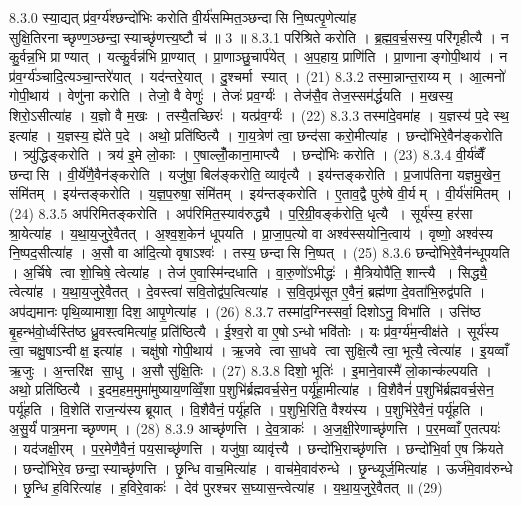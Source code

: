 8.3.0
स्या॒द्यत् प्र॑व॒र्ग्य॑श्छन्दो॑भिः करोति वी॒र्य॑सम्मित॒ञ्छन्दासि नि॒ष्पत्पृ॒णेत्या॑ह सुक्षि॒तिरनाच्छृण्ण॒ञ्छन्दा॒स्याच्छृ॑णत्त्य॒ष्टौ च॑ ॥ 3 ॥
8.3.1
परि॑श्रिते करोति । ब्र॒ह्म॒व॒र्च॒सस्य॒ परि॑गृहीत्यै । न कु॒र्वन्न॒भि प्राण्यात् । यत्कु॒र्वन्न॑भि प्रा॒ण्यात् । प्रा॒णाञ्छु॒चार्प॑येत् । अ॒प॒हाय॒ प्राणि॑ति । प्रा॒णानाङ्गोपी॒थाय॑ । न प्र॑व॒र्ग्य॑ञ्चादि॒त्यञ्चा॒न्तरे॑यात् । यद॑न्तरे॒यात् । दु॒श्चर्मा स्यात् । (21)
8.3.2
तस्मा॒न्नान्त॒राय्यम् । आ॒त्मनो॑ गोपी॒थाय॑ । वेणु॑ना करोति । तेजो॒ वै वेणुः॑ । तेजः॑ प्रव॒र्ग्यः॑ । तेज॑सै॒व तेज॒स्सम॑र्द्धयति । म॒खस्य॒ शिरो॒ऽसीत्या॑ह । य॒ज्ञो वै म॒खः । तस्यै॒तच्छिरः॑ । यत्प्र॑व॒र्ग्यः॑ । (22)
8.3.3
तस्मा॑दे॒वमा॑ह । य॒ज्ञस्य॑ प॒दे स्थ॒ इत्या॑ह । य॒ज्ञस्य॒ ह्ये॑ते प॒दे । अथो॒ प्रति॑ष्ठित्यै । गा॒य॒त्रेण॑ त्वा॒ छन्द॑सा करो॒मीत्या॑ह । छन्दो॑भिरे॒वैन॑ङ्करोति । त्र्यु॑द्धिङ्करोति । त्रय॑ इ॒मे लो॒काः । ए॒षाल्लोँ॒काना॒माप्त्यै । छन्दो॑भिः करोति । (23)
8.3.4
वी॒र्य॑व्वैँ छन्दासि । वी॒र्ये॑णै॒वैन॑ङ्करोति । यजु॑षा॒ बिल॑ङ्करोति॒ व्यावृ॑त्यै । इय॑न्तङ्करोति । प्र॒जाप॑तिना यज्ञमु॒खेन॒ संमि॑तम् । इय॑न्तङ्करोति । य॒ज्ञ॒प॒रुषा॒ संमि॑तम् । इय॑न्तङ्करोति । ए॒ताव॒द्वै पुरु॑षे वी॒र्यम् । वी॒र्य॑संमितम् । (24)
8.3.5
अप॑रिमितङ्करोति । अप॑रिमित॒स्याव॑रुद्ध्यै । प॒रि॒ग्री॒वङ्क॑रोति॒ धृत्यै । सूर्य॑स्य॒ हर॑सा श्रा॒येत्या॑ह । य॒था॒य॒जुरे॒वैतत् । अ॒श्व॒श॒केन॑ धूपयति । प्रा॒जा॒प॒त्यो वा अश्व॑स्सयोनि॒त्वाय॑ । वृष्णो॒ अश्व॑स्य नि॒ष्पद॒सीत्या॑ह । अ॒सौ वा आ॑दि॒त्यो वृषाऽश्वः॑ । तस्य॒ छन्दासि नि॒ष्पत् । (25)
8.3.6
छन्दो॑भिरे॒वैन॑न्धूपयति । अ॒र्चिषे त्वा शो॒चिषे॒ त्वेत्या॑ह । तेज॑ ए॒वास्मि॑न्दधाति । वा॒रु॒णो॑ऽभीद्धः॑ । मै॒त्रियोपै॑ति॒ शान्त्यै । सिद्ध्यै॒ त्वेत्या॑ह । य॒था॒य॒जुरे॒वैतत् । दे॒वस्त्वा॑ सवि॒तोद्व॑प॒त्वित्या॑ह । स॒वि॒तृप्र॑सूत ए॒वैनं॒ ब्रह्म॑णा दे॒वता॑भि॒रुद्व॑पति । अप॑द्यमानः पृथि॒व्यामाशा॒ दिश॒ आपृ॒णेत्या॑ह । (26)
8.3.7
तस्मा॑द॒ग्निस्सर्वा॒ दिशोऽनु॒ विभा॑ति । उत्ति॑ष्ठ बृ॒हन्भ॑वो॒र्ध्वस्ति॑ष्ठ ध्रु॒वस्त्वमित्या॑ह॒ प्रति॑ष्ठित्यै । ई॒श्व॒रो वा ए॒षोऽन्धो भवि॑तोः । यः प्र॑व॒र्ग्य॑म॒न्वीक्ष॑ते । सूर्य॑स्य त्वा॒ चक्षु॒षाऽन्वीक्ष॒ इत्या॑ह । चक्षु॑षो गोपी॒थाय॑ । ऋ॒जवे त्वा सा॒धवे त्वा सुक्षि॒त्यै त्वा॒ भूत्यै॒ त्वेत्या॑ह । इ॒यव्वाँ ऋ॒जुः । अ॒न्तरि॑क्ष सा॒धु । अ॒सौ सु॑क्षि॒तिः । (27)
8.3.8
दिशो॒ भूतिः॑ । इ॒माने॒वास्मै॑ लो॒कान्क॑ल्पयति । अथो॒ प्रति॑ष्ठित्यै । इ॒दम॒हम॒मुमा॑मुष्याय॒णव्विँ॒शा प॒शुभि॑र्ब्रह्मवर्च॒सेन॒ पर्यू॑हा॒मीत्या॑ह । वि॒शैवैनं॑ प॒शुभि॑र्ब्रह्मवर्च॒सेन॒ पर्यू॑हति । वि॒शेति॑ राज॒न्य॑स्य ब्रूयात् । वि॒शैवैनं॒ पर्यू॑हति । प॒शुभि॒रिति॒ वैश्य॑स्य । प॒शुभि॑रे॒वैनं॒ पर्यू॑हति । अ॒सु॒र्यं॑ पात्र॒मनाच्छृण्णम् । (28)
8.3.9
आच्छृ॑णत्ति । दे॒व॒त्राकः॑ । अ॒ज॒क्षी॒रेणाच्छृ॑णत्ति । प॒र॒मव्वाँ ए॒तत्पयः॑ । यद॑जक्षी॒रम् । प॒र॒मेणै॒वैनं॒ पय॒साच्छृ॑णत्ति । यजु॑षा॒ व्यावृ॑त्त्यै । छन्दो॑भि॒राच्छृ॑णत्ति । छन्दो॑भि॒र्वा ए॒ष क्रि॑यते । छन्दो॑भिरे॒व छन्दा॒स्याच्छृ॑णत्ति । छृ॒न्धि वाच॒मित्या॑ह । वाच॑मे॒वाव॑रुन्धे । छृ॒न्ध्यूर्ज॒मित्या॑ह । ऊर्ज॑मे॒वाव॑रुन्धे । छृ॒न्धि ह॒विरित्या॑ह । ह॒विरे॒वाकः॑ । देव॑ पुरश्चर स॒घ्यास॒न्त्वेत्या॑ह । य॒था॒य॒जुरे॒वैतत् ॥ (29)
\anuvakamend

